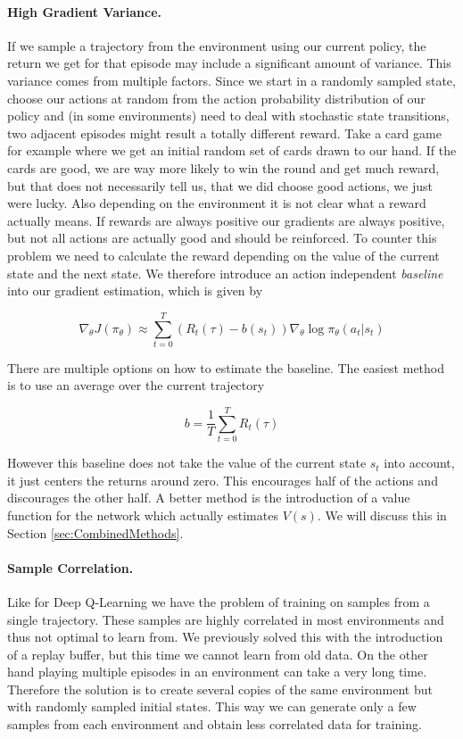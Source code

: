 \paragraph{High Gradient Variance.}
If we sample a trajectory from the environment using our current policy, the return we get for that episode may include a significant amount of variance. This variance comes from multiple factors. Since we start in a randomly sampled state, choose our actions at random from the action probability distribution of our policy and (in some environments) need to deal with stochastic state transitions, two adjacent episodes might result a totally different reward. Take a card game for example where we get an initial random set of cards drawn to our hand. If the cards are good, we are way more likely to win the round and get much reward, but that does not necessarily tell us, that we did choose good actions, we just were lucky. Also depending on the environment it is not clear what a reward actually means. If rewards are always positive our gradients are always positive, but not all actions are actually good and should be reinforced. To counter this problem we need to calculate the reward depending on the value of the current state and the next state. We therefore introduce an action independent \textit{baseline} into our gradient estimation, which is given by 

\[\nabla_\theta J(\pi_\theta) \approx \sum^T_{t=0}(R_t(\tau) - b(s_t)) \nabla_\theta \log \pi_\theta(a_t|s_t)\]

There are multiple options on how to estimate the baseline. The easiest method is to use an average over the current trajectory

\[b = \frac{1}{T} \sum^T_{t=0}R_t(\tau)\]

However this baseline does not take the value of the current state $s_t$ into account, it just centers the returns around zero. This encourages half of the actions and discourages the other half. A better method is the introduction of a value function for the network which actually estimates $V(s)$. We will discuss this in Section \ref{sec:CombinedMethods}.

\paragraph{Sample Correlation.}
Like for Deep Q-Learning we have the problem of training on samples from a single trajectory. These samples are highly correlated in most environments and thus not optimal to learn from. We previously solved this with the introduction of a replay buffer, but this time we cannot learn from old data. On the other hand playing multiple episodes in an environment can take a very long time. Therefore the solution is to create several copies of the same environment but with randomly sampled initial states. This way we can generate only a few samples from each environment and obtain less correlated data for training.


